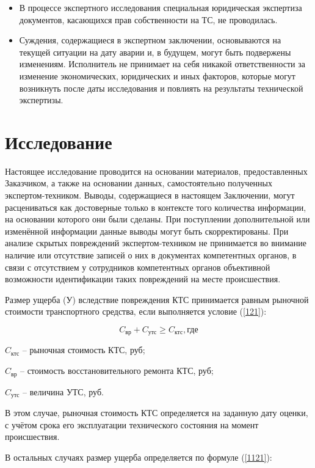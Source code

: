 \begin{itemize}
\item  {В процессе экспертного исследования специальная юридическая экспертиза документов, касающихся прав собственности на ТС, не проводилась.}
\item  {Суждения, содержащиеся в экспертном заключении, основываются на текущей ситуации на дату аварии и, в будущем, могут быть подвержены изменениям.
Исполнитель не принимает на себя никакой ответственности за изменение экономических, юридических и иных факторов, которые могут возникнуть после даты исследования и повлиять на результаты технической экспертизы.
}
\end{itemize}
%
%
\section{Исследование}
%
Настоящее исследование проводится на основании материалов, предоставленных Заказчиком, а также на основании данных, самостоятельно полученных экспертом-техником. Выводы, содержащиеся в настоящем Заключении, могут расцениваться как достоверные только в контексте того количества информации, на основании которого они были сделаны. При поступлении дополнительной или изменённой информации данные выводы могут быть
скорректированы. При анализе скрытых повреждений экспертом-техником не принимается во внимание наличие или отсутствие записей о них в документах компетентных органов, в связи с отсутствием у сотрудников компетентных органов объективной возможности  идентификации таких повреждений на месте происшествия.

\par Размер ущерба (У) вследствие повреждения КТС принимается равным рыночной стоимости транспортного средства, если выполняется условие (\ref{121}):

\begin{equation}\label{121}
C_\text{вр} + C_\text{утс} \geq  C_\text{ктс},    \text{где}
\end{equation}

$  C_\text{ктс} $ --  рыночная стоимость КТС, руб;

$ C_\text{вр}  $ -- стоимость восстановительного ремонта КТС, руб;

$ C_\text{утс} $ --  величина УТС, руб.

В этом случае, рыночная стоимость КТС определяется на заданную дату оценки, с учётом срока его эксплуатации технического состояния на момент происшествия.

В остальных случаях размер ущерба определяется по формуле (\ref{1121}):

